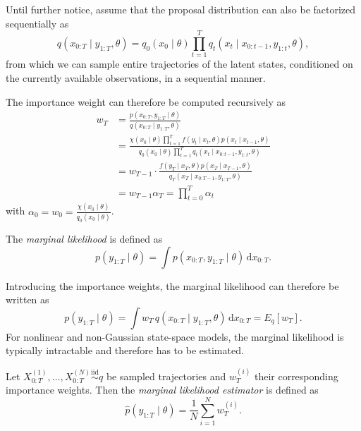 Until further notice, assume that the proposal distribution can also be factorized sequentially as
\begin{equation}
q(x_{0:T}\mid y_{1:T},\theta) = q_0(x_0\mid\theta) \prod_{t=1}^T q_t(x_t\mid x_{0:t-1},y_{1:t},\theta),
\end{equation}
from which we can sample entire trajectories of the latent states, conditioned on the currently available observations, in a sequential manner.

The importance weight can therefore be computed recursively as
\begin{align}
    w_T &= \frac{p(x_{0:T},y_{1:T}\mid\theta)}{q(x_{0:T}\mid y_{1:T},\theta)} \\
    &= \frac{\chi(x_0\mid\theta) \prod_{t=1}^T f(y_t\mid x_t,\theta) p(x_t\mid x_{t-1},\theta)}{q_0(x_0\mid\theta) \prod_{t=1}^T q_t(x_t\mid x_{0:t-1},y_{1:t},\theta)} \\
    &= w_{T-1} \cdot \frac{f(y_T\mid x_T,\theta) p(x_T\mid x_{T-1},\theta)}{q_T(x_T\mid x_{0:T-1},y_{1:T},\theta)} \\
    &= w_{T-1} \alpha_T = \prod_{t=0}^{T} \alpha_t
\end{align}
with $\alpha_0 = w_0 = \frac{\chi(x_0\mid\theta)}{q_0(x_0\mid\theta)}$.

\begin{definition}
    \label{def:marginal_likelihood}
    The \emph{marginal likelihood} is defined as
    \begin{equation}
        p(y_{1:T}\mid\theta) = \int p(x_{0:T},y_{1:T}\mid\theta)\,\mathrm{d}x_{0:T}.
    \end{equation}
\end{definition}
Introducing the importance weights, the marginal likelihood can therefore be written as
\begin{equation}
    p(y_{1:T}\mid\theta) = \int w_T\, q(x_{0:T}\mid y_{1:T},\theta)\,\mathrm{d}x_{0:T} = E_q[w_T].
\end{equation}
For nonlinear and non-Gaussian state-space models, the marginal likelihood is typically intractable and therefore has to be estimated.

\begin{definition}
    \label{def:marginal_likelihood_estimator}
    Let $X_{0:T}^{(1)},\ldots,X_{0:T}^{(N)} \overset{\mathrm{iid}}{\sim} q$ be sampled trajectories and $w_T^{(i)}$ their corresponding importance weights.
    Then the \emph{marginal likelihood estimator} is defined as
    \begin{equation}
        \hat{p}(y_{1:T}\mid\theta) = \frac{1}{N} \sum_{i=1}^{N} w_T^{(i)}.
        \label{eq:marginal_likelihood_estimator}
    \end{equation}
\end{definition}

